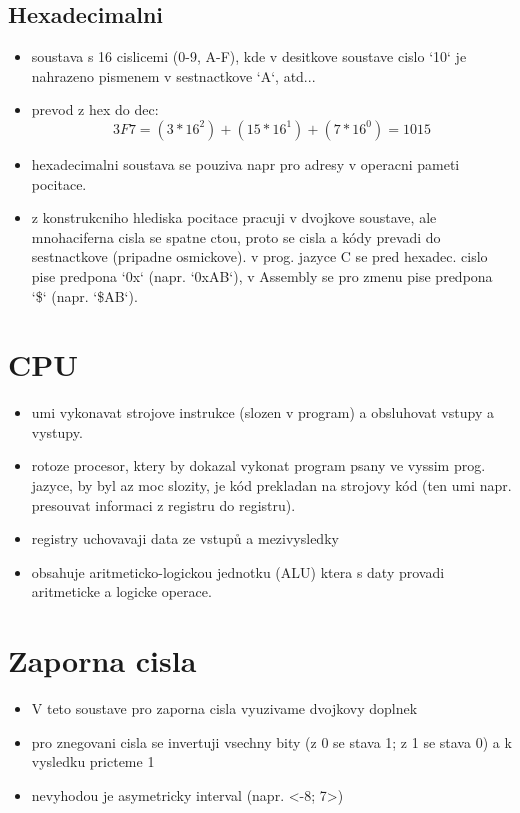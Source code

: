 \documentclass[a4paper,12pt]{article}
\begin{document}
    \subsection{Hexadecimalni}
        \begin{itemize}
            \item{soustava s 16 cislicemi (0-9, A-F), kde v desitkove soustave cislo `10` je nahrazeno pismenem v sestnactkove `A`, atd...}
            \item{prevod z hex do dec: $$ 3F7 = (3*16^2) + (15*16^1) + (7*16^0) = 1015 $$}
            \item{hexadecimalni soustava se pouziva napr pro adresy v operacni pameti pocitace.}
            \item{z konstrukcniho hlediska pocitace pracuji v dvojkove soustave, ale mnohaciferna cisla se spatne ctou, proto se cisla a kódy prevadi do sestnactkove (pripadne osmickove). v prog. jazyce C se pred hexadec. cislo pise predpona `0x` (napr. `0xAB`), v Assembly se pro zmenu pise predpona `\$` (napr. `\$AB`).}
        \end{itemize}

\section{CPU}
    \begin{itemize}
        \item{umi vykonavat strojove instrukce (slozen v program) a obsluhovat vstupy a vystupy.}
        \item{rotoze procesor, ktery by dokazal vykonat program psany ve vyssim prog. jazyce, by byl az moc slozity, je kód prekladan na strojovy kód (ten umi napr. presouvat informaci z registru do registru).}
        \item{registry uchovavaji data ze vstupů a mezivysledky}
        \item{obsahuje aritmeticko-logickou jednotku (ALU) ktera s daty provadi aritmeticke a logicke operace.}
    \end{itemize}
    
\section{Zaporna cisla}
    \begin{itemize}
        \item{V teto soustave pro zaporna cisla vyuzivame dvojkovy doplnek}
        \item{pro znegovani cisla se invertuji vsechny bity (z 0 se stava 1; z 1 se stava 0) a k vysledku pricteme 1}
        \item{nevyhodou je asymetricky interval (napr. <-8; 7>)}
    \end{itemize}
    
\end{document}
